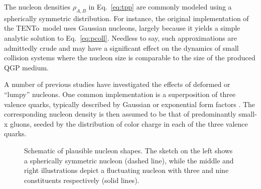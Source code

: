\documentclass[aps,prc,reprint,amsmath,nofootinbib]{revtex4-1}
\newcommand{\trento}{T\raisebox{-0.5ex}{R}ENTo}
\begin{document}
The nucleon densities $\rho_{A,B}$ in Eq.~\eqref{eq:tpp} are commonly modeled using a spherically symmetric distribution.
For instance, the original implementation of the \trento\ model uses Gaussian nucleons, largely because it yields a simple analytic solution to Eq.~\eqref{eq:pcoll}.
Needless to say, such approximations are admittedly crude and may have a significant effect on the dynamics of small collision systems where the nucleon size is comparable to the size of the produced QGP medium.

A number of previous studies have investigated the effects of deformed or ``lumpy'' nucleons.
One common implementation is a superposition of three valence quarks, typically described by Gaussian or exponential form factors \cite{Welsh:2016siu, Bozek:2017jog, Schenke:2014zha, Schlichting:2014ipa, Adare:2015bua, Broniowski:2016pvx}.
The corresponding nucleon density is then assumed to be that of predominantly small-x gluons, seeded by the distribution of color charge in each of the three valence quarks.

\begin{figure}
  \caption{
    \label{fig:substructure}
    Schematic of plausible nucleon shapes.
    The sketch on the left shows a spherically symmetric nucleon (dashed line), while the middle and right illustrations depict a fluctuating nucleon with three and nine constituents respectively (solid lines).
  }
\end{figure}
\end{document}
